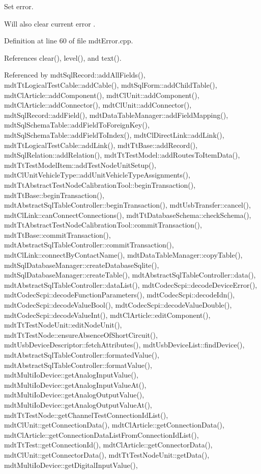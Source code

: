 Set error. 

Will also clear current error . 

Definition at line 60 of file mdt\-Error.\-cpp.



References clear(), level(), and text().



Referenced by mdt\-Sql\-Record\-::add\-All\-Fields(), mdt\-Tt\-Logical\-Test\-Cable\-::add\-Cable(), mdt\-Sql\-Form\-::add\-Child\-Table(), mdt\-Cl\-Article\-::add\-Component(), mdt\-Cl\-Unit\-::add\-Component(), mdt\-Cl\-Article\-::add\-Connector(), mdt\-Cl\-Unit\-::add\-Connector(), mdt\-Sql\-Record\-::add\-Field(), mdt\-Data\-Table\-Manager\-::add\-Field\-Mapping(), mdt\-Sql\-Schema\-Table\-::add\-Field\-To\-Foreign\-Key(), mdt\-Sql\-Schema\-Table\-::add\-Field\-To\-Index(), mdt\-Cl\-Direct\-Link\-::add\-Link(), mdt\-Tt\-Logical\-Test\-Cable\-::add\-Link(), mdt\-Tt\-Base\-::add\-Record(), mdt\-Sql\-Relation\-::add\-Relation(), mdt\-Tt\-Test\-Model\-::add\-Routes\-To\-Item\-Data(), mdt\-Tt\-Test\-Model\-Item\-::add\-Test\-Node\-Unit\-Setup(), mdt\-Cl\-Unit\-Vehicle\-Type\-::add\-Unit\-Vehicle\-Type\-Assignments(), mdt\-Tt\-Abstract\-Test\-Node\-Calibration\-Tool\-::begin\-Transaction(), mdt\-Tt\-Base\-::begin\-Transaction(), mdt\-Abstract\-Sql\-Table\-Controller\-::begin\-Transaction(), mdt\-Usb\-Transfer\-::cancel(), mdt\-Cl\-Link\-::can\-Connect\-Connections(), mdt\-Tt\-Database\-Schema\-::check\-Schema(), mdt\-Tt\-Abstract\-Test\-Node\-Calibration\-Tool\-::commit\-Transaction(), mdt\-Tt\-Base\-::commit\-Transaction(), mdt\-Abstract\-Sql\-Table\-Controller\-::commit\-Transaction(), mdt\-Cl\-Link\-::connect\-By\-Contact\-Name(), mdt\-Data\-Table\-Manager\-::copy\-Table(), mdt\-Sql\-Database\-Manager\-::create\-Database\-Sqlite(), mdt\-Sql\-Database\-Manager\-::create\-Table(), mdt\-Abstract\-Sql\-Table\-Controller\-::data(), mdt\-Abstract\-Sql\-Table\-Controller\-::data\-List(), mdt\-Codec\-Scpi\-::decode\-Device\-Error(), mdt\-Codec\-Scpi\-::decode\-Function\-Parameters(), mdt\-Codec\-Scpi\-::decode\-Idn(), mdt\-Codec\-Scpi\-::decode\-Value\-Bool(), mdt\-Codec\-Scpi\-::decode\-Value\-Double(), mdt\-Codec\-Scpi\-::decode\-Value\-Int(), mdt\-Cl\-Article\-::edit\-Component(), mdt\-Tt\-Test\-Node\-Unit\-::edit\-Node\-Unit(), mdt\-Tt\-Test\-Node\-::ensure\-Absence\-Of\-Short\-Circuit(), mdt\-Usb\-Device\-Descriptor\-::fetch\-Attributes(), mdt\-Usb\-Device\-List\-::find\-Device(), mdt\-Abstract\-Sql\-Table\-Controller\-::formated\-Value(), mdt\-Abstract\-Sql\-Table\-Controller\-::format\-Value(), mdt\-Multi\-Io\-Device\-::get\-Analog\-Input\-Value(), mdt\-Multi\-Io\-Device\-::get\-Analog\-Input\-Value\-At(), mdt\-Multi\-Io\-Device\-::get\-Analog\-Output\-Value(), mdt\-Multi\-Io\-Device\-::get\-Analog\-Output\-Value\-At(), mdt\-Tt\-Test\-Node\-::get\-Channel\-Test\-Connection\-Id\-List(), mdt\-Cl\-Unit\-::get\-Connection\-Data(), mdt\-Cl\-Article\-::get\-Connection\-Data(), mdt\-Cl\-Article\-::get\-Connection\-Data\-List\-From\-Connection\-Id\-List(), mdt\-Tt\-Test\-::get\-Connection\-Id(), mdt\-Cl\-Article\-::get\-Connector\-Data(), mdt\-Cl\-Unit\-::get\-Connector\-Data(), mdt\-Tt\-Test\-Node\-Unit\-::get\-Data(), mdt\-Multi\-Io\-Device\-::get\-Digital\-Input\-Value(), 
